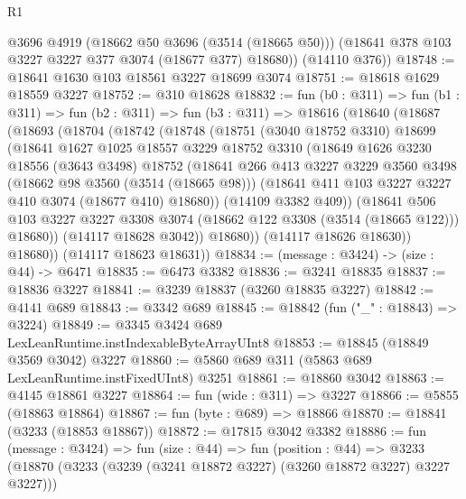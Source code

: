 \begin{lexlean}{R1}
\begin{coremodule}
        @3696
        @4919
        (@18662 @50 @3696 (@3514 (@18665 @50)))
        (@18641 @378 @103 @3227 @3227 @377 @3074 (@18677 @377) @18680))
      (@14110 @376))
@18748 := @18641 @1630 @103 @18561 @3227 @18699 @3074
@18751 := @18618 @1629 @18559 @3227
@18752 := @310 @18628
@18832 := fun (b0 : @311) =>
  fun (b1 : @311) =>
  fun (b2 : @311) =>
  fun (b3 : @311) =>
  @18616
    (@18640
      (@18687
        (@18693
          (@18704
            (@18742
              (@18748
                (@18751
                  (@3040 @18752 @3310)
                  @18699
                  (@18641
                    @1627
                    @1025
                    @18557
                    @3229
                    @18752
                    @3310
                    (@18649
                      @1626
                      @3230
                      @18556
                      (@3643 @3498)
                      @18752
                      (@18641
                        @266
                        @413
                        @3227
                        @3229
                        @3560
                        @3498
                        (@18662 @98 @3560 (@3514 (@18665 @98)))
                        (@18641 @411 @103 @3227 @3227 @410 @3074 (@18677 @410) @18680))
                      (@14109 @3382 @409))
                    (@18641
                      @506
                      @103
                      @3227
                      @3227
                      @3308
                      @3074
                      (@18662 @122 @3308 (@3514 (@18665 @122)))
                      @18680))
                  (@14117 @18628 @3042))
                @18680))
            (@14117 @18626 @18630))
          @18680))
      (@14117 @18623 @18631))
@18834 := (message : @3424) -> (size : @44) -> @6471
@18835 := @6473 @3382
@18836 := @3241 @18835
@18837 := @18836 @3227
@18841 := @3239 @18837 (@3260 @18835 @3227)
@18842 := @4141 @689
@18843 := @3342 @689
@18845 := @18842 (fun ("_" : @18843) => @3224)
@18849 := @3345 @3424 @689 LexLeanRuntime.instIndexableByteArrayUInt8
@18853 := @18845 (@18849 @3569 @3042) @3227
@18860 := @5860 @689 @311 (@5863 @689 LexLeanRuntime.instFixedUInt8) @3251
@18861 := @18860 @3042
@18863 := @4145 @18861 @3227
@18864 := fun (wide : @311) => @3227
@18866 := @5855 (@18863 @18864)
@18867 := fun (byte : @689) => @18866
@18870 := @18841 (@3233 (@18853 @18867))
@18872 := @17815 @3042 @3382
@18886 := fun (message : @3424) =>
  fun (size : @44) =>
  fun (position : @44) =>
  @3233 (@18870 (@3233 (@3239 (@3241 @18872 @3227) (@3260 @18872 @3227) @3227 @3227)))

\end{coremodule}
\end{lexlean}
